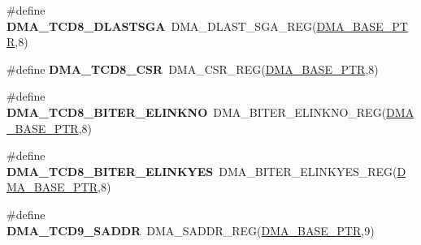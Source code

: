 \begin{DoxyCompactItemize}
\item 
\hypertarget{group___d_m_a___register___accessor___macros_ga1337c2ad5e7240758afd7abec5e06af4}{}\#define {\bfseries D\+M\+A\+\_\+\+T\+C\+D8\+\_\+\+D\+L\+A\+S\+T\+S\+G\+A}~D\+M\+A\+\_\+\+D\+L\+A\+S\+T\+\_\+\+S\+G\+A\+\_\+\+R\+E\+G(\hyperlink{group___d_m_a___peripheral_ga6997fbc1b1973e9f27170217a3bd6f22}{D\+M\+A\+\_\+\+B\+A\+S\+E\+\_\+\+P\+T\+R},8)\label{group___d_m_a___register___accessor___macros_ga1337c2ad5e7240758afd7abec5e06af4}

\item 
\hypertarget{group___d_m_a___register___accessor___macros_ga803ebab170f7e3a1979cb7e9a58d3f1c}{}\#define {\bfseries D\+M\+A\+\_\+\+T\+C\+D8\+\_\+\+C\+S\+R}~D\+M\+A\+\_\+\+C\+S\+R\+\_\+\+R\+E\+G(\hyperlink{group___d_m_a___peripheral_ga6997fbc1b1973e9f27170217a3bd6f22}{D\+M\+A\+\_\+\+B\+A\+S\+E\+\_\+\+P\+T\+R},8)\label{group___d_m_a___register___accessor___macros_ga803ebab170f7e3a1979cb7e9a58d3f1c}

\item 
\hypertarget{group___d_m_a___register___accessor___macros_ga4d20f91416d78e491c9f030b53cc7bcf}{}\#define {\bfseries D\+M\+A\+\_\+\+T\+C\+D8\+\_\+\+B\+I\+T\+E\+R\+\_\+\+E\+L\+I\+N\+K\+N\+O}~D\+M\+A\+\_\+\+B\+I\+T\+E\+R\+\_\+\+E\+L\+I\+N\+K\+N\+O\+\_\+\+R\+E\+G(\hyperlink{group___d_m_a___peripheral_ga6997fbc1b1973e9f27170217a3bd6f22}{D\+M\+A\+\_\+\+B\+A\+S\+E\+\_\+\+P\+T\+R},8)\label{group___d_m_a___register___accessor___macros_ga4d20f91416d78e491c9f030b53cc7bcf}

\item 
\hypertarget{group___d_m_a___register___accessor___macros_gad040442b5582baa8e415dd881c0ad939}{}\#define {\bfseries D\+M\+A\+\_\+\+T\+C\+D8\+\_\+\+B\+I\+T\+E\+R\+\_\+\+E\+L\+I\+N\+K\+Y\+E\+S}~D\+M\+A\+\_\+\+B\+I\+T\+E\+R\+\_\+\+E\+L\+I\+N\+K\+Y\+E\+S\+\_\+\+R\+E\+G(\hyperlink{group___d_m_a___peripheral_ga6997fbc1b1973e9f27170217a3bd6f22}{D\+M\+A\+\_\+\+B\+A\+S\+E\+\_\+\+P\+T\+R},8)\label{group___d_m_a___register___accessor___macros_gad040442b5582baa8e415dd881c0ad939}

\item 
\hypertarget{group___d_m_a___register___accessor___macros_gabfaa87b6ce7fcca896ef0bea621484b0}{}\#define {\bfseries D\+M\+A\+\_\+\+T\+C\+D9\+\_\+\+S\+A\+D\+D\+R}~D\+M\+A\+\_\+\+S\+A\+D\+D\+R\+\_\+\+R\+E\+G(\hyperlink{group___d_m_a___peripheral_ga6997fbc1b1973e9f27170217a3bd6f22}{D\+M\+A\+\_\+\+B\+A\+S\+E\+\_\+\+P\+T\+R},9)\label{group___d_m_a___register___accessor___macros_gabfaa87b6ce7fcca896ef0bea621484b0}


\end{DoxyCompactItemize}
